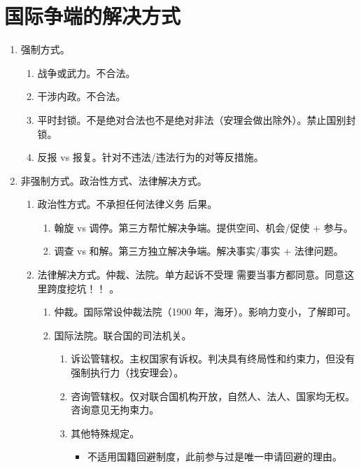 \section{国际争端的解决方式}
\begin{enumerate}
  \item 强制方式。
        \begin{enumerate}
          \item 战争或武力。不合法。
          \item 干涉内政。不合法。
          \item 平时封锁。不是绝对合法也不是绝对非法（安理会做出除外）。禁止国别封锁。
          \item 反报 vs 报复。针对不违法/违法行为的对等反措施。
        \end{enumerate}
  \item 非强制方式。政治性方式、法律解决方式。
        \begin{enumerate}
          \item 政治性方式。不承担任何法律义务 \hz 后果。
                \begin{enumerate}
                  \item 翰旋 vs 调停。第三方帮忙解决争端。提供空间、机会/促使 + 参与。
                  \item 调查 vs 和解。第三方独立解决争端。解决事实/事实 + 法律问题。
                \end{enumerate}
          \item 法律解决方式。仲裁、法院。单方起诉不受理 \yjt 需要当事方都同意。同意这里跨度挖坑！！
                。
                \begin{enumerate}
                  \item 仲裁。国际常设仲裁法院（1900 年，海牙）。影响力变小，了解即可。
                  \item 国际法院。联合国的司法机关。
                        \begin{enumerate}
                          \item 诉讼管辖权。\yi 主权国家有诉权。\er 判决具有终局性和约束力，但没有强制执行力（找安理会）。
                          \item 咨询管辖权。仅对联合国机构开放，自然人、法人、国家均无权。咨询意见无拘束力。
                          \item 其他特殊规定。
                                \begin{itemize}
                                  \item 不适用国籍回避制度，此前参与过是唯一申请回避的理由。

\end{itemize}
\end{enumerate}
\end{enumerate}
\end{enumerate}
\end{enumerate}
